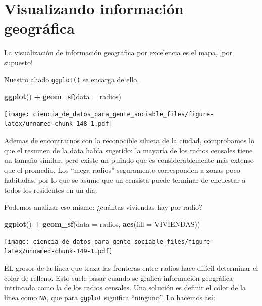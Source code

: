 \documentclass[spanish,]{book}
\newenvironment{Shaded}{\begin{snugshade}}{\end{snugshade}}
\newcommand{\DataTypeTok}[1]{\textcolor[rgb]{0.13,0.29,0.53}{#1}}
\newcommand{\KeywordTok}[1]{\textcolor[rgb]{0.13,0.29,0.53}{\textbf{#1}}}
\newcommand{\NormalTok}[1]{#1}
\newcommand{\OperatorTok}[1]{\textcolor[rgb]{0.81,0.36,0.00}{\textbf{#1}}}
\newcommand{\StringTok}[1]{\textcolor[rgb]{0.31,0.60,0.02}{#1}}
\begin{document}
\hypertarget{visualizando-informaciuxf3n-geogruxe1fica}{%
\section{Visualizando información geográfica}\label{visualizando-informaciuxf3n-geogruxe1fica}}

La visualización de información geográfica por excelencia es el mapa, ¡por supuesto!

Nuestro aliado \texttt{ggplot()} se encarga de ello.

\begin{Shaded}
\begin{Highlighting}[]
\KeywordTok{ggplot}\NormalTok{() }\OperatorTok{+}\StringTok{ }\KeywordTok{geom_sf}\NormalTok{(}\DataTypeTok{data =}\NormalTok{ radios)}
\end{Highlighting}
\end{Shaded}

\texttt{[image: ciencia\_de\_datos\_para\_gente\_sociable\_files/figure-latex/unnamed-chunk-148-1.pdf]}

Ademas de encontrarnos con la reconocible silueta de la ciudad, comprobamos lo que el resumen de la data había sugerido: la mayoría de los radios censales tiene un tamaño similar, pero existe un puñado que es considerablemente más extenso que el promedio. Los ``mega radios'' seguramente corresponden a zonas poco habitadas, por lo que se asume que un censista puede terminar de encuestar a todos los residentes en un día.

Podemos analizar eso mismo: ¿cuántas viviendas hay por radio?

\begin{Shaded}
\begin{Highlighting}[]
\KeywordTok{ggplot}\NormalTok{() }\OperatorTok{+}\StringTok{ }\KeywordTok{geom_sf}\NormalTok{(}\DataTypeTok{data =}\NormalTok{ radios, }\KeywordTok{aes}\NormalTok{(}\DataTypeTok{fill =}\NormalTok{ VIVIENDAS)) }
\end{Highlighting}
\end{Shaded}

\texttt{[image: ciencia\_de\_datos\_para\_gente\_sociable\_files/figure-latex/unnamed-chunk-149-1.pdf]}

EL grosor de la línea que traza las fronteras entre radios hace difícil determinar el color de relleno. Esto suele pasar cuando se grafica información geográfica intrincada como la de los radios censales. Una solución es definir el color de la línea como \texttt{NA}, que para \texttt{ggplot} significa ``ninguno''. Lo hacemos así:
\end{document}
